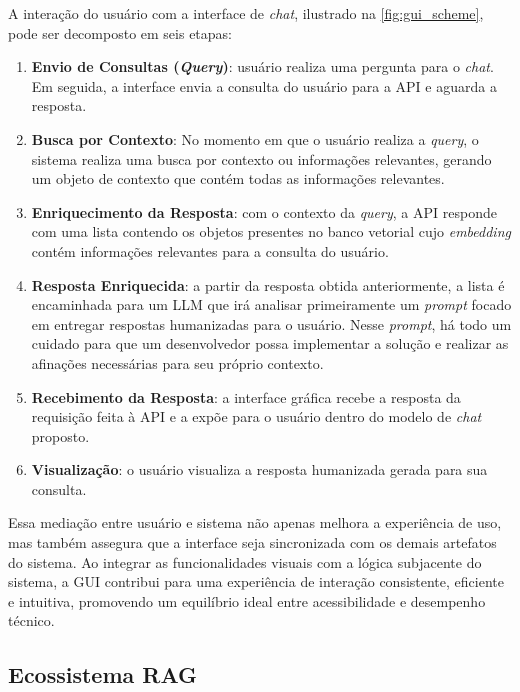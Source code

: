 \documentclass[a4paper, 12pt]{article}
\begin{document}
    A interação do usuário com a interface de \textit{chat}, ilustrado na \autoref{fig:gui_scheme}, pode ser decomposto em seis etapas:
    
    \begin{enumerate}
        \item \textbf{Envio de Consultas (\textit{Query})}: usuário realiza uma pergunta para o \textit{chat}. Em seguida, a interface envia a consulta do usuário para a API e aguarda a resposta.
        \item \textbf{Busca por Contexto}: No momento em que o usuário realiza a \textit{query}, o sistema realiza uma busca por contexto ou informações relevantes, gerando um objeto de contexto que contém todas as informações relevantes.
        \item \textbf{Enriquecimento da Resposta}: com o contexto da \textit{query}, a API responde com uma lista contendo os objetos presentes no banco vetorial cujo \textit{embedding} contém informações relevantes para a consulta do usuário.
        \item \textbf{Resposta Enriquecida}: a partir da resposta obtida anteriormente, a lista é encaminhada para um LLM que irá analisar primeiramente um \textit{prompt} focado em entregar respostas humanizadas para o usuário. Nesse \textit{prompt}, há todo um cuidado para que um desenvolvedor possa implementar a solução e realizar as afinações necessárias para seu próprio contexto.
        \item \textbf{Recebimento da Resposta}: a interface gráfica recebe a resposta da requisição feita à API e a expõe para o usuário dentro do modelo de \textit{chat} proposto.
        \item \textbf{Visualização}: o usuário visualiza a resposta humanizada gerada para sua consulta.
    \end{enumerate}

    Essa mediação entre usuário e sistema não apenas melhora a experiência de uso, mas também assegura que a interface seja sincronizada com os demais artefatos do sistema. Ao integrar as funcionalidades visuais com a lógica subjacente do sistema, a GUI contribui para uma experiência de interação consistente, eficiente e intuitiva, promovendo um equilíbrio ideal entre acessibilidade e desempenho técnico.
    
    \subsection{Ecossistema RAG} \label{sec:ecosystem}
    
\end{document}

